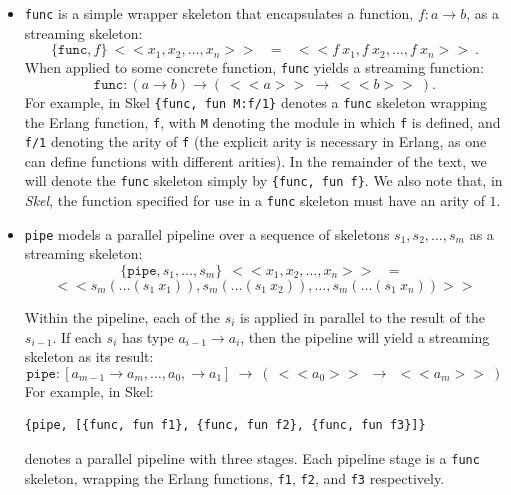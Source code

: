 \documentclass[final]{jfp1}
\newcommand{\func}[0]{\texttt{func}\xspace}
\newcommand{\stream}[1]{~<\!\!<#1>\!\!>~}
\begin{document}
\begin{itemize}
\item \texttt{func} is a simple wrapper skeleton that
  encapsulates a function, $f : a \rightarrow b$, as a streaming skeleton:
  $$ \{ \texttt{func}, f \} \stream{x_1,x_2,\dots,x_n} ~~=~~ \stream{f~x_1, f~x_2,\dots, f~x_n}.$$
  When applied to some concrete function, \texttt{func} yields a streaming function:  
  $$\texttt{func} : (a \rightarrow b) \rightarrow (\stream{a} \rightarrow \stream{b}).$$
For example, in Skel \lstinline|{func, fun M:f/1}| denotes a \func skeleton wrapping the 
Erlang function, \lstinline|f|, with \lstinline|M| denoting the module in which 
\lstinline|f| is defined, and \lstinline|f/1| denoting the arity of \lstinline|f| (the explicit arity is necessary in Erlang, as one can define functions with different arities). 
In the remainder of the text, we will denote the \func skeleton simply by \lstinline|{func, fun f}|.
We also note that, in \emph{Skel}, the function specified for
use in a \func skeleton must have an arity of $1$.

\item \texttt{pipe} models a parallel pipeline over a sequence
  of skeletons  $s_1, s_2, \dots, s_m$ as a streaming skeleton:
$$ \{ \texttt{pipe}, s_1, \dots, s_m\}~ \stream{x_1, x_2, \dots, x_n} ~~=~~$$ $$ \stream{s_m (\ldots (s_1~x_1)), s_m (\ldots (s_1~x_2)), \dots, s_m (\ldots (s_1~x_n))}$$

  Within the pipeline, each of the $s_i$ is applied in parallel to the
  result of the $s_{i-1}$.
  If each $s_{i}$ has type $a_{i-1} \rightarrow a_{i}$, then the
  pipeline will yield a streaming skeleton as its result:
  $$\texttt{pipe} : [a_{m-1}\rightarrow a_{m}, \ldots,  a_0, \rightarrow a_1] ~\rightarrow~ (\stream{a_0} ~\rightarrow~ \stream{a_{m}})$$
  For example, in Skel:
\begin{lstlisting}
{pipe, [{func, fun f1}, {func, fun f2}, {func, fun f3}]}
\end{lstlisting}
denotes a parallel pipeline with three stages. Each pipeline stage is a
\texttt{func} skeleton, wrapping the Erlang functions, \texttt{f1}, \texttt{f2},
and \texttt{f3} respectively.


\end{itemize}
\end{document}
